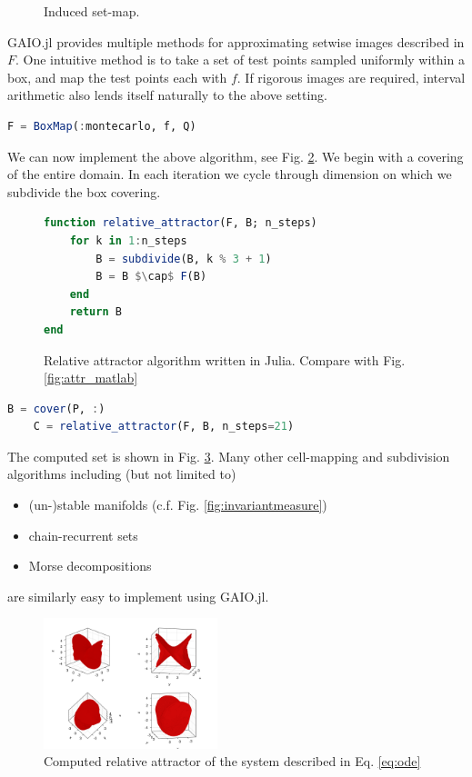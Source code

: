 \documentclass{juliacon}
\begin{document}
\begin{figure}
    \centering
    
    \caption{Induced set-map.}
    \label{fig:boxcover}
\end{figure}

GAIO.jl provides multiple methods for approximating setwise images described in $F$. One intuitive method is to take a set of test points sampled uniformly within a box, and map the test points each with $f$. If rigorous images are required, interval arithmetic also lends itself naturally to the above setting. 

\begin{lstlisting}[language=Julia]
    F = BoxMap(:montecarlo, f, Q)
\end{lstlisting}

We can now implement the above algorithm, see Fig. \ref{fig:attr_julia}. We begin with a covering of the entire domain. In each iteration we cycle through dimension on which we subdivide the box covering. 

\begin{figure}
\begin{lstlisting}[language=Julia,label=lst:relative_attractor,mathescape]
function relative_attractor(F, B; n_steps)
    for k in 1:n_steps
        B = subdivide(B, k % 3 + 1)
        B = B $\cap$ F(B)
    end
    return B
end
\end{lstlisting}
\caption{Relative attractor algorithm written in Julia. Compare with Fig. \ref{fig:attr_matlab}}
\label{fig:attr_julia}
\end{figure}

\begin{lstlisting}[language=Julia,mathescape]
    B = cover(P, :)
    C = relative_attractor(F, B, n_steps=21)
\end{lstlisting}

The computed set is shown in Fig. \ref{fig:attractor}. Many other cell-mapping and subdivision algorithms including (but not limited to)

\begin{itemize}
    \item (un-)stable manifolds (c.f. Fig. \ref{fig:invariantmeasure})
    \item chain-recurrent sets
    \item Morse decompositions
\end{itemize}

are similarly easy to implement using GAIO.jl. 

\begin{figure}
    \centering
    \includegraphics[width=0.45\textwidth]{attractor.png}
    \caption{Computed relative attractor of the system described in Eq. \ref{eq:ode}}
    \label{fig:attractor}
\end{figure}
\end{document}
